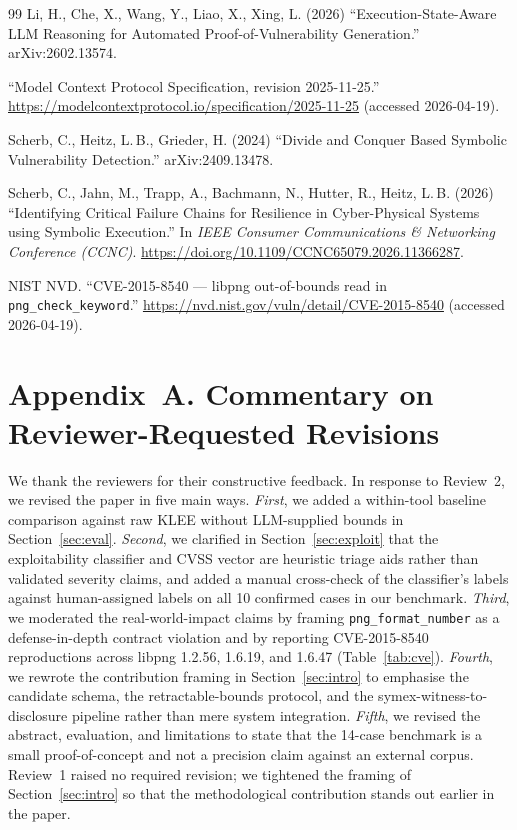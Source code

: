 \documentclass[3p,times,procedia]{elsarticle}
\begin{document}
\begin{thebibliography}{99}
 Li, H., Che, X., Wang, Y., Liao, X., Xing, L. (2026) ``Execution-State-Aware LLM Reasoning for Automated Proof-of-Vulnerability Generation.'' arXiv:2602.13574.

 ``Model Context Protocol Specification, revision 2025-11-25.'' \url{https://modelcontextprotocol.io/specification/2025-11-25} (accessed 2026-04-19).

 Scherb, C., Heitz, L.\,B., Grieder, H. (2024) ``Divide and Conquer Based Symbolic Vulnerability Detection.'' arXiv:2409.13478.

 Scherb, C., Jahn, M., Trapp, A., Bachmann, N., Hutter, R., Heitz, L.\,B. (2026) ``Identifying Critical Failure Chains for Resilience in Cyber-Physical Systems using Symbolic Execution.'' In \emph{IEEE Consumer Communications \& Networking Conference (CCNC)}. \url{https://doi.org/10.1109/CCNC65079.2026.11366287}.

 NIST NVD. ``CVE-2015-8540 --- libpng out-of-bounds read in \texttt{png\_check\_keyword}.'' \url{https://nvd.nist.gov/vuln/detail/CVE-2015-8540} (accessed 2026-04-19).

\end{thebibliography}

\clearpage
\section*{Appendix~A. Commentary on Reviewer-Requested Revisions}

We thank the reviewers for their constructive feedback. In response to Review~2, we revised the paper in five main ways. \emph{First}, we added a within-tool baseline comparison against raw KLEE without LLM-supplied bounds in Section~\ref{sec:eval}. \emph{Second}, we clarified in Section~\ref{sec:exploit} that the exploitability classifier and CVSS vector are heuristic triage aids rather than validated severity claims, and added a manual cross-check of the classifier's labels against human-assigned labels on all 10 confirmed cases in our benchmark. \emph{Third}, we moderated the real-world-impact claims by framing \texttt{png\_format\_number} as a defense-in-depth contract violation and by reporting CVE-2015-8540 \cite{cve20158540} reproductions across libpng 1.2.56, 1.6.19, and 1.6.47 (Table~\ref{tab:cve}). \emph{Fourth}, we rewrote the contribution framing in Section~\ref{sec:intro} to emphasise the candidate schema, the retractable-bounds protocol, and the symex-witness-to-disclosure pipeline rather than mere system integration. \emph{Fifth}, we revised the abstract, evaluation, and limitations to state that the 14-case benchmark is a small proof-of-concept and not a precision claim against an external corpus. Review~1 raised no required revision; we tightened the framing of Section~\ref{sec:intro} so that the methodological contribution stands out earlier in the paper.
\end{document}
